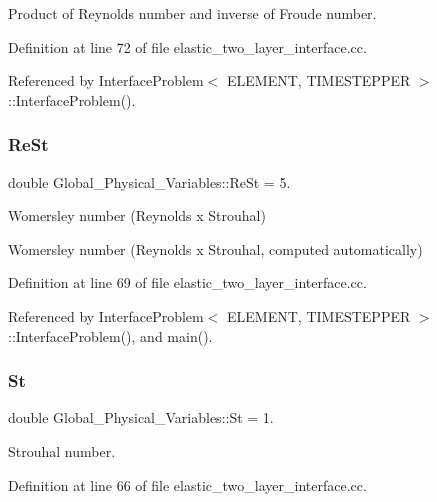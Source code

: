Product of Reynolds number and inverse of Froude number. 



Definition at line 72 of file elastic\+\_\+two\+\_\+layer\+\_\+interface.\+cc.



Referenced by Interface\+Problem$<$ E\+L\+E\+M\+E\+N\+T, T\+I\+M\+E\+S\+T\+E\+P\+P\+E\+R $>$\+::\+Interface\+Problem().

\mbox{\label{namespaceGlobal__Physical__Variables_a085ee4bf968ffdd01a41b8c41864f907}} 
\subsubsection{\texorpdfstring{Re\+St}{ReSt}}
{\footnotesize\ttfamily double Global\+\_\+\+Physical\+\_\+\+Variables\+::\+Re\+St = 5.}



Womersley number (Reynolds x Strouhal) 

Womersley number (Reynolds x Strouhal, computed automatically) 

Definition at line 69 of file elastic\+\_\+two\+\_\+layer\+\_\+interface.\+cc.



Referenced by Interface\+Problem$<$ E\+L\+E\+M\+E\+N\+T, T\+I\+M\+E\+S\+T\+E\+P\+P\+E\+R $>$\+::\+Interface\+Problem(), and main().

\mbox{\label{namespaceGlobal__Physical__Variables_a4b6ef72bd221361c37f5b9a4a6899afc}} 
\subsubsection{\texorpdfstring{St}{St}}
{\footnotesize\ttfamily double Global\+\_\+\+Physical\+\_\+\+Variables\+::\+St = 1.}



Strouhal number. 



Definition at line 66 of file elastic\+\_\+two\+\_\+layer\+\_\+interface.\+cc.



